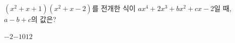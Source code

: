 $(x^2+x+1)(x^2+x-2)$를 전개한 식이 $ax^4+2x^3+bx^2+cx-2$일 때, $a-b+c$의 값은? 
\begin{choices32}{$-2$}{$-1$}{$0$}{$1$}{$2$}\end{choices32}
